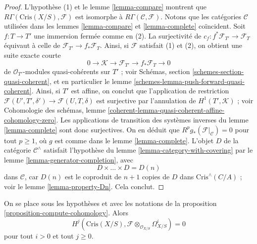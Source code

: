 \begin{proof}
L'hypothèse (1) et le lemme \ref{lemma-compare} montrent que
$R\Gamma(\text{Cris}(X/S), \mathcal{F})$ est isomorphe à
$R\Gamma(\mathcal{C}, \mathcal{F})$. Notons que les catégories
$\mathcal{C}$ utilisées dans les lemmes \ref{lemma-compare} et \ref{lemma-complete}
coïncident. Soit $f : T \to T'$ une immersion fermée comme en (2). La surjectivité
de $c_f : f^*\mathcal{F}_{T'} \to \mathcal{F}_T$ équivaut à celle
de $\mathcal{F}_{T'} \to f_*\mathcal{F}_T$. Ainsi, si
$\mathcal{F}$ satisfait (1) et (2), on obtient une suite exacte courte
$$
0 \to \mathcal{K} \to \mathcal{F}_{T'} \to f_*\mathcal{F}_T \to 0
$$
de $\mathcal{O}_{T'}$-modules quasi-cohérents sur $T'$ ; voir
Schémas, section \ref{schemes-section-quasi-coherent}, et en particulier le
lemme \ref{schemes-lemma-push-forward-quasi-coherent}.
Ainsi, si $T'$ est affine, on conclut que l'application de restriction
$\mathcal{F}(U', T', \delta') \to \mathcal{F}(U, T, \delta)$
est surjective par l'annulation de $H^1(T', \mathcal{K})$ ; voir
Cohomologie des schémas, lemme
\ref{coherent-lemma-quasi-coherent-affine-cohomology-zero}.
Les applications de transition des systèmes inverses du lemme \ref{lemma-complete}
sont donc surjectives. On en déduit que
$R^pg_*(\mathcal{F}|_\mathcal{C}) = 0$ pour tout $p \geq 1$,
où $g$ est comme dans le lemme \ref{lemma-complete}.
L'objet $D$ de la catégorie $\mathcal{C}^\wedge$
satisfait l'hypothèse du lemme \ref{lemma-category-with-covering} par le
lemme \ref{lemma-generator-completion},
avec
$$
D \times \ldots \times D = D(n)
$$
dans $\mathcal{C}$, car $D(n)$ est le coproduit de $n + 1$ copies de
$D$ dans $\text{Cris}^\wedge(C/A)$ ; voir le lemme \ref{lemma-property-Dn}.
Cela conclut.
\end{proof}

\begin{lemma}
\label{lemma-cohomology-is-zero}
On se place sous les hypothèses et avec les notations de la
proposition \ref{proposition-compute-cohomology}.
Alors
$$
H^j(\text{Cris}(X/S), \mathcal{F} \otimes_{\mathcal{O}_{X/S}} \Omega^i_{X/S})
= 0
$$
pour tout $i > 0$ et tout $j \geq 0$.
\end{lemma}

